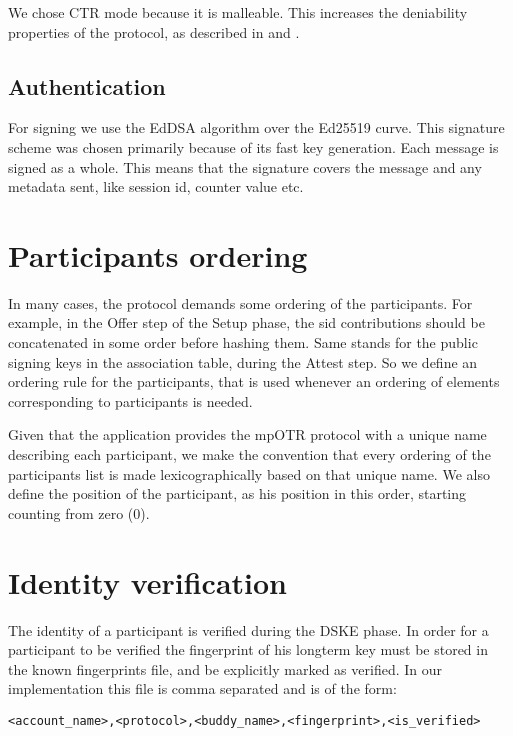 We chose CTR mode because it is malleable.
This increases the deniability properties of the protocol, as described in \cite{otr} and \cite{otr_improvedauth}.

\subsection{Authentication}
For signing we use the EdDSA algorithm over the Ed25519 curve.
This signature scheme was chosen primarily because of its fast key generation.
Each message is signed as a whole.
This means that the signature covers the message and any metadata sent, like session id, counter value etc.

\section{Participants ordering}
\label{sections:participants_ordering}
In many cases, the protocol demands some ordering of the participants. For example, in the Offer step of the Setup phase, the sid contributions should be concatenated in some order before hashing them. Same stands for the public signing keys in the association table, during the Attest step. So we define an ordering rule for the participants, that is used whenever an ordering of elements corresponding to participants is needed.

Given that the application provides the mpOTR protocol with a unique name describing each participant, we make the convention that every ordering of the participants list is made lexicographically based on that unique name. We also define the position of the participant, as his position in this order, starting counting from zero (0).

\section{Identity verification}
The identity of a participant is verified during the DSKE phase.
In order for a participant to be verified the fingerprint of his longterm key must be stored in the known fingerprints file, and be explicitly marked as verified.
In our implementation this file is comma separated and is of the form:

\begin{verbatim}
<account_name>,<protocol>,<buddy_name>,<fingerprint>,<is_verified>
\end{verbatim}

